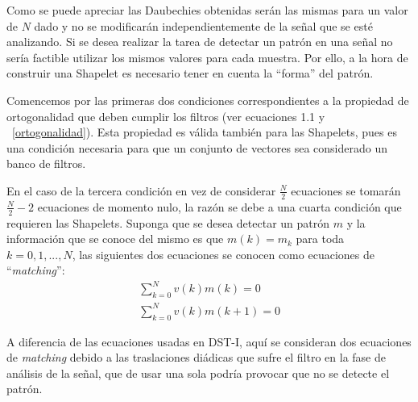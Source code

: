 \par Como se puede apreciar las Daubechies obtenidas ser\'an las mismas para un valor de $N$ dado y no se modificar\'an independientemente de la se\~nal que se est\'e analizando. Si se desea realizar la tarea de detectar un patr\'on en una se\~nal no ser\'ia factible utilizar los mismos valores para cada muestra. Por ello, a la hora de construir una Shapelet es necesario tener en cuenta la ``forma'' del patr\'on.

\par Comencemos por las primeras dos condiciones correspondientes a la propiedad de ortogonalidad que deben cumplir los filtros (ver ecuaciones 1.1 y ~\ref{ortogonalidad}). Esta propiedad es v\'alida tambi\'en para las Shapelets, pues es una condici\'on necesaria para que un conjunto de vectores sea considerado un banco de filtros.

\par En el caso de la tercera condici\'on en vez de considerar $\frac{N}{2}$ ecuaciones se tomar\'an $\frac{N}{2}-2$ ecuaciones de momento nulo, la raz\'on se debe a una cuarta condici\'on que requieren las Shapelets. Suponga que se desea detectar un patr\'on $m$ y la informaci\'on que se conoce del mismo es que $m(k)=m_k$ para toda $k=0,1,...,N$, las siguientes dos ecuaciones se conocen como ecuaciones de ``\textit{matching}'':
\begin{eqnarray}
\sum_{k=0}^{N}v(k)m(k)=0
\label{matching1}\\
\sum_{k=0}^{N}v(k)m(k+1)=0
\label{matching2}
\end{eqnarray}

\par A diferencia de las ecuaciones usadas en DST-I, aqu\'i se consideran dos ecuaciones de \textit{matching} debido a las traslaciones di\'adicas que sufre el filtro en la fase de an\'alisis de la se\~nal, que de usar una sola podr\'ia provocar que no se detecte el patr\'on.\\

